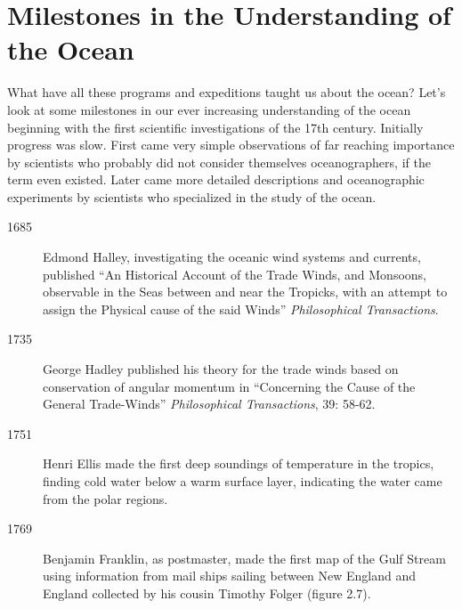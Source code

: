 \section{Milestones in the Understanding of the Ocean}
What have all these programs and expeditions taught us about the
ocean?  Let's look at some milestones in our ever increasing
understanding of the ocean beginning with the first scientific
investigations of the 17th century.  Initially progress was
slow. First came very simple observations of far reaching importance
by scientists who probably did not consider themselves oceanographers,
if the term even existed. Later came more detailed descriptions and
oceanographic experiments by scientists who specialized in the study
of the ocean.
\vspace{-1.0ex}
\begin{description}
\item[1685] Edmond Halley, investigating the oceanic wind systems and currents, published
  ``An Historical Account of the Trade Winds, and Monsoons, observable
  in the Seas between and near the Tropicks, with an attempt to assign
  the Physical cause of the said Winds'' \textit{Philosophical
    Transactions}. \vspace{-1.0ex}

\item[1735] George Hadley published his theory for the trade winds
  based on conservation of angular momentum in ``Concerning the Cause
  of the General Trade-Winds'' \textit{Philosophical Transactions},
  39: 58-62. \vspace{-1.0ex}

\item[1751] Henri Ellis made the first deep soundings of temperature
  in the tropics, finding cold water below a warm surface layer,
  indicating the water came from the polar regions. \vspace{-1.0ex}

\item[1769] Benjamin Franklin, as postmaster, made the first map of
  the Gulf Stream using
  information from mail ships sailing between New England and England
  collected by his cousin Timothy Folger (figure 2.7).


\end{description}
